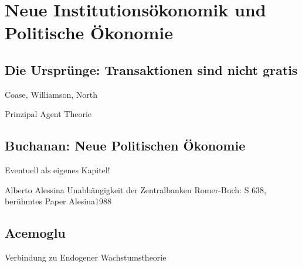 %
%
%

\chapter{Neue Institutionsökonomik und Politische Ökonomie}
\label{Neue Institut}

\section{Die Ursprünge: Transaktionen sind nicht gratis} \label{sec: Neue Inst}
Coase, Williamson, North

Prinzipal Agent Theorie



\section{Buchanan: Neue Politischen Ökonomie}
\label{Pol_Econ}

Eventuell als eigenes Kapitel!

Alberto Alessina
Unabhängigkeit der Zentralbanken Romer-Buch: S 638, berühmtes Paper Alesina1988

\section{Acemoglu}
Verbindung zu Endogener Wachstumstheorie

